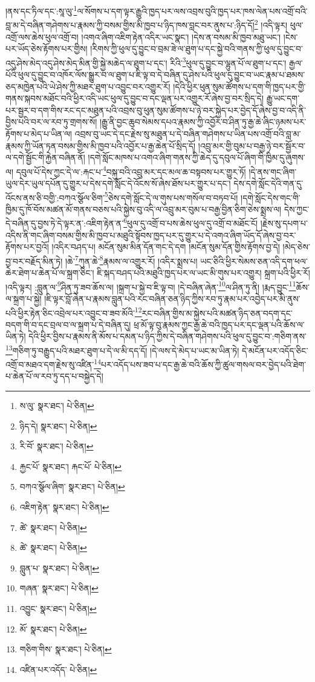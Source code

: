 །ནས་དང་ཏིལ་དང་:སཱ་ལུ་\footnote{ས་ལུ་  སྣར་ཐང་།  པེ་ཅིན། }ལ་སོགས་པ་དག་ལྟར་རྒྱུའི་ཁྱད་པར་ལས་འབྲས་བུའི་ཁྱད་པར་ཁས་ལེན་པས་འགྲོ་བའི་བླ་མ་དེ་བཞིན་གཤེགས་པ་རྣམས་ཀྱི་བསམ་གྱིས་མི་ཁྱབ་པ་ཉིད་ཁས་བླང་བར་ནུས་པ་:ཉིད་དོ།\footnote{ཉིད་དེ།  སྣར་ཐང་།  པེ་ཅིན། } །འདི་ལྟར། ཕུལ་འགྲོ་ལས་ཆེས་ཕུལ་འགྲོ་བ། །འགའ་ཞིག་འཇིག་རྟེན་འདིར་ཡང་སྣང་། །དེས་ན་བསམ་མི་ཁྱབ་མཐུ་ཡང་། །ངེས་པར་ཡོད་ཅེས་རྟོགས་པར་གྱིས། །རིགས་ཀྱི་ཕུལ་དུ་བྱུང་བ་བྲམ་ཟེ་ལ་ཐུག་པ་དང་སྐྱེ་བའི་གནས་ཀྱི་ཕུལ་དུ་བྱུང་བ་འདུ་ཤེས་མེད་འདུ་ཤེས་མེད་མིན་གྱི་སྐྱེ་མཆེད་ལ་ཐུག་པ་དང་། རིའི་\footnote{རི་བོ་  སྣར་ཐང་།  པེ་ཅིན། }ཕུལ་དུ་བྱུང་བ་ལྷུན་པོ་ལ་ཐུག་པ་དང་། རྒྱལ་པོའི་ཕུལ་དུ་བྱུང་བ་འཁོར་ལོས་སྒྱུར་བ་ལ་ཐུག་པ་ཇི་ལྟ་བ་དེ་བཞིན་དུ་ཤེས་པའི་ཕུལ་དུ་བྱུང་བ་ཡང་རྣམ་པ་ཐམས་ཅད་མཁྱེན་པའི་ཡེ་ཤེས་ཀྱི་མཐར་ཐུག་པ་འབྱུང་བར་འགྱུར་རོ། །དེའི་ཕྱིར་ཕུན་སུམ་ཚོགས་པ་དག་གི་ཁྱད་པར་གྱི་གནས་སྐབས་མཐོང་བའི་ཕྱིར་འདི་ཡང་ཕུལ་དུ་བྱུང་བ་དང་ལྡན་པར་འགྱུར་རོ་ཞེས་བྱ་བར་སྲིད་དེ། རྒྱུ་ཡང་དག་པར་སྦྱར་བ་དག་གིས་རང་དང་མཐུན་པའི་འབྲས་བུ་ཕུན་སུམ་ཚོགས་པ་ཉེ་བར་སྐྱེད་པར་བྱེད་དོ་ཞེས་བྱ་བ་འདི་ནི་བྱིས་པའི་བར་ལ་རབ་ཏུ་གྲགས་སོ། །རྒྱུ་ནི་བྱང་ཆུབ་སེམས་དཔའ་རྣམས་ཀྱི་འབྱོར་བ་ཤིན་ཏུ་རྒྱ་ཆེ་ཞིང་ཉམས་པར་རྟོགས་པ་མེད་པ་ཡིན་ལ། འབྲས་བུ་ཡང་དེ་དང་རྗེས་སུ་མཐུན་པ་དེ་བཞིན་གཤེགས་པ་ཡིན་པས་འགྲོ་བའི་བླ་མ་རྣམས་ཀྱི་ཡོན་ཏན་བསམ་གྱིས་མི་ཁྱབ་པའི་འབྱོར་པ་རྒྱ་ཆེན་པོ་སྲིད་དོ། །འབྲུ་མར་གྱི་བུམ་པ་བརྒྱ་ཉེ་བར་སྦྱོར་བ་ལ་དགེ་སྦྱོང་གི་རྐྱེན་བཞིན་ནོ། །དགེ་སློང་མཁས་པ་འགའ་ཞིག་གནས་ཀྱི་ཆེད་དུ་དབུལ་པོ་ཞིག་གི་ཁྱིམ་དུ་ཞུགས་ལ། དབུལ་པོ་དེས་ཀྱང་དེ་ལ་:རྐང་པ་\footnote{རྐྱང་པོ་  སྣར་ཐང་། རྐང་པོ་  པེ་ཅིན། }བསྐུ་བའི་འབྲུ་མར་དང་མལ་ཆ་བསྟབས་པར་གྱུར་ཏོ། །དེ་ནས་གང་ཞིག་ཡུལ་དེར་ཡུལ་དཔོན་དུ་གྱུར་པ་དེས་དགེ་སློང་དེ་འོངས་སོ་ཞེས་ཐོས་པར་གྱུར་པ་དང་། དེས་དགེ་སློང་དེའི་གན་དུ་འོངས་ནས་ཅི་བགྱི་:བཀའ་སྩོལ་ཅིག་\footnote{བཀའ་སྩོལ་ཞིག་  སྣར་ཐང་།  པེ་ཅིན། }ཅེས་དགེ་སློང་དེ་ལ་གུས་པས་གསོལ་བ་བཏབ་པོ། །དགེ་སློང་དེས་གང་གི་ཁྱིམ་དུ་ཁོ་བོས་མཚན་མོ་གནས་བཅས་པའི་སྐྱེས་བུ་འདི་ལ་འབྲུ་མར་བུམ་པ་བརྒྱ་བྱིན་ཅིག་ཅེས་སྨྲས་ལ། དེས་ཀྱང་དེ་བཞིན་དུ་བྱས་ཏེ་དེ་ལྟར་ན་:འཇིག་རྟེན་ན་\footnote{འཇིག་རྟེན་  སྣར་ཐང་།  པེ་ཅིན། }ཕུལ་དུ་འགྲོ་བ་པས་ཆེས་ཕུལ་དུ་འགྲོ་བ་མཐོང་ངོ། །རྗེས་སུ་དཔག་པ་འདིས་ནི་གང་ཞིག་བསམ་གྱིས་མི་ཁྱབ་པ་མཐུའི་སྟོབས་ཁྱད་པར་དུ་གྱུར་པ་དེ་འགའ་ཞིག་ཡོད་དོ་ཞེས་བྱ་བར་རྟོགས་པར་བྱའོ། །འདིར་བཤད་པ། མངོན་སུམ་མིན་དོན་གང་དེ་དག །མངོན་སུམ་དོན་གྱིས་རྟོགས་བྱ་དེ། །མེད་ཅེས་བྱ་བར་བརྗོད་མིན་ཏེ། །ཆེ་\footnote{ཚེ་  སྣར་ཐང་།  པེ་ཅིན། }ཀུན་ཆེ་\footnote{ཚེ་  སྣར་ཐང་།  པེ་ཅིན། }རྣམས་ལ་འགྱུར་རོ། །འདིར་སྨྲས་པ། ཡང་ཅིའི་ཕྱིར་སེམས་ཅན་འདི་དག་ཕལ་ཆེར་ཐེག་པ་ཆེན་པོ་ལ་སྐྲག་ཅིང་། ཇི་སྐད་བཤད་པའི་མཐུའི་ཁྱད་པར་ལ་ཡང་མི་གུས་པར་འགྱུར། སྐྲག་པའི་ཕྱིར་རོ། །འདི་ལྟར། :བླུན་ལ་\footnote{བླུན་པ་  སྣར་ཐང་།  པེ་ཅིན། }ཤིན་ཏུ་ཟབ་ཆོས་ལ། །སྐྲག་པ་སྐྱེ་བ་ཇི་ལྟ་བ། །དེ་བཞིན་ཞེན་\footnote{གཞན་  སྣར་ཐང་།  པེ་ཅིན། }ལ་ཤིན་ཏུ་ནི། །རྨད་བྱུང་\footnote{འབྱུང་  སྣར་ཐང་།  པེ་ཅིན། }ཆོས་ལ་སྐྲག་པ་སྐྱེ། །ཇི་ལྟར་བློ་ཞེན་པ་རྣམས་བླུན་པའི་རང་བཞིན་ཅན་ཉིད་ཀྱིས་རབ་ཏུ་རྣམ་པར་འབྱེད་པར་མི་ནུས་པའི་ཕྱིར་རྟེན་ཅིང་འབྲེལ་པར་འབྱུང་བ་ཟབ་མོའི་\footnote{མོ་  སྣར་ཐང་།  པེ་ཅིན། }རང་བཞིན་གྱིས་མ་སྐྱེས་པའི་མཚན་ཉིད་ཅན་བདག་དང་བདག་གི་བ་དང་བྲལ་བ་ལ་སྐྲག་པ་དེ་བཞིན་དུ། ཕྲ་མོ་ལྟ་བུ་རྣམས་ཀྱང་རྒྱ་ཆེ་བའི་ཁྱད་པར་དང་ལྡན་པའི་ཆོས་ལ་ཡིན་ཏེ། དེའི་ཕྱིར་བྱིས་པ་རྣམས་ནི་མོས་པ་དམན་པ་ཉིད་ཀྱིས་དེ་བཞིན་གཤེགས་པའི་ཕུལ་དུ་བྱུང་བ་:གཅིག་ནས་\footnote{གཅིག་གིས་  སྣར་ཐང་།  པེ་ཅིན། }གཅིག་ཏུ་བརྒྱུད་པའི་མཐར་ཐུག་པ་དེ་ལ་མི་དད་དོ། །དེ་ལས་དེ་མེད་པ་ཡང་མ་ཡིན་ཏེ། དེ་མངོན་པར་འདོད་ཅིང་འགྲོ་བ་མཐའ་དག་རྗེས་སུ་འཛིན་\footnote{འཛིན་པར་འདོད་  པེ་ཅིན། }པར་འདོད་པས་ཟབ་པ་དང་རྒྱ་ཆེ་བའི་ཆོས་ཀྱི་ཚུལ་གསལ་བར་བྱེད་པའི་ཐེག་པ་ཆེན་པོ་ལ་རབ་ཏུ་དད་པ་བསྐྱེད་དེ། 